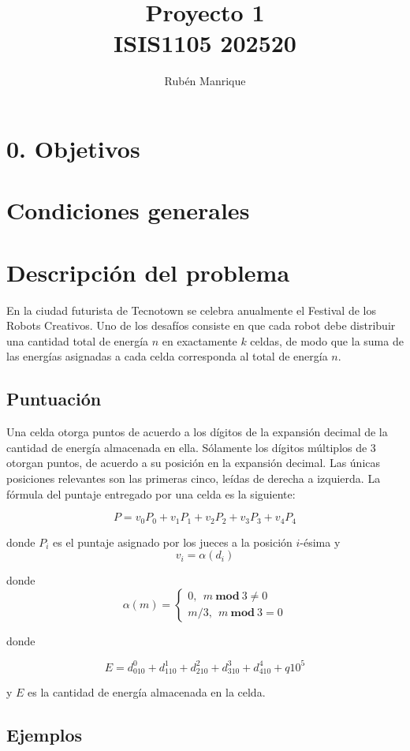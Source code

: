\documentclass{amsart}
\title{Proyecto 1\\ ISIS1105 202520}
\author{Rubén Manrique}
\begin{document}
\maketitle

\section*{0. Objetivos}

\section{Condiciones generales}

\section{Descripción del problema}	
En la ciudad futurista de Tecnotown se celebra anualmente el Festival de los
Robots Creativos. Uno de los desafíos consiste en que cada robot debe distribuir
una cantidad total de energía $n$ en exactamente $k$ celdas, de modo que la suma de
las energías asignadas a cada celda corresponda al total de energía $n$.

\subsection{Puntuación}
Una celda otorga puntos de acuerdo a los dígitos de la expansión decimal de la
cantidad de energía almacenada en ella. Sólamente los dígitos múltiplos de 3 otorgan
puntos, de acuerdo a su posición en la expansión decimal. Las únicas posiciones
relevantes son las primeras cinco, leídas de derecha a izquierda. La fórmula del
puntaje entregado por una celda es la siguiente:

\[
	P= v_0P_0 + v_1 P_1 + v_2 P_2 + v_3 P_3 + v_4 P_4
\]

donde $P_i$ es el puntaje asignado por los jueces a la posición $i$-ésima y
\[
	v_i= \alpha(d_i)
\]

donde
\[
	\alpha(m)=
	\begin{cases}
		0,\ \ m \ \mathbf{mod}\ 3 \not= 0\\
		m/3,\ \ m\ \mathbf{mod}\ 3 = 0
	\end{cases}
\]

donde

\[
	E = d_010^0 + d_110^1 + d_210^2 + d_310^3 + d_410^4 + q10^5
\]

y $E$ es la cantidad de energía almacenada en la celda.

\subsection{Ejemplos}
\end{document}
